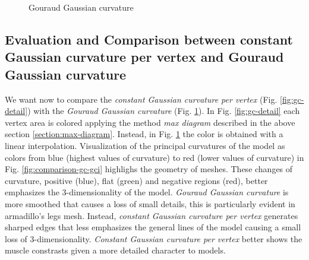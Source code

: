 \begin{figure}[!h]
    \endminipage
    \caption{Gouraud Gaussian curvature} \label{fig:gci-detail}
\end{figure}


\subsection{Evaluation and Comparison between constant Gaussian curvature per vertex and Gouraud Gaussian curvature}
We want now to compare the \textit{constant Gaussian curvature per vertex} (Fig. \ref{fig:gc-detail}) with the \textit{Gouraud Gaussian curvature} (Fig. \ref{fig:gci-detail}).
In Fig. \ref{fig:gc-detail} each vertex area is colored applying the method \textit{max diagram} described in the above section \ref{section:max-diagram}. Instead, in Fig. \ref{fig:gci-detail} the color is obtained with a linear interpolation.
Visualization of the principal curvatures of the model as colors from blue (highest values of curvature) to red (lower values of curvature) in Fig. \ref{fig:comparison-gc-gci} highlighs the geometry of meshes.
These changes of curvature, positive (blue), flat (green) and negative regions (red), better emphasizes the 3-dimensionality of the model.
\textit{Gouraud Gaussian curvature} is more smoothed that causes a loss of small details, this is particularly evident in armadillo's legs mesh. Instead, \textit{constant Gaussian curvature per vertex} generates sharped edges that less emphasizes the general lines of the model causing a small loss of 3-dimensionality.
\textit{Constant Gaussian curvature per vertex} better shows the muscle constrasts given a more detailed character to models.

